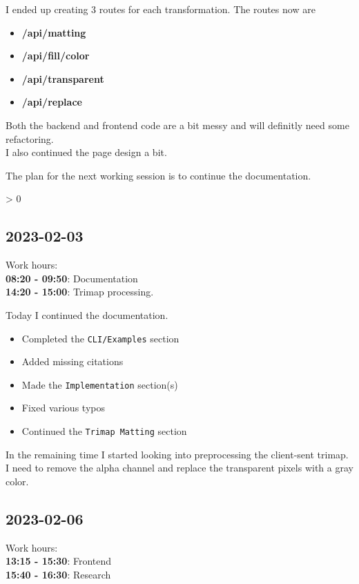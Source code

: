 \documentclass{article}
\makeatletter
\newcommand{\wrapfill}{
    \par
    \ifnum \value{WF@wrappedlines} > 0
        \addtocounter{WF@wrappedlines}{-1}%
        \null\vspace{
            \arabic{WF@wrappedlines}
            \baselineskip
        }
        \WFclear
    \fi
}
\makeatother
\begin{document}
I ended up creating 3 routes for each transformation. The routes now are
\begin{itemize}
    \item \textbf{/api/matting}
    \item \textbf{/api/fill/color}
    \item \textbf{/api/transparent}
    \item \textbf{/api/replace}
\end{itemize}

Both the backend and frontend code are a bit messy and will definitly
need some refactoring. \\
I also continued the page design a bit.

The plan for the next working session is to continue the documentation.

\wrapfill

\pagebreak

\subsection{2023-02-03}

Work hours:\\
\textbf{08:20 - 09:50}: Documentation \\
\textbf{14:20 - 15:00}: Trimap processing.

Today I continued the documentation.

\begin{itemize}
    \item Completed the \texttt{CLI/Examples} section
    \item Added missing citations
    \item Made the \texttt{Implementation} section(s)
    \item Fixed various typos
    \item Continued the \texttt{Trimap Matting} section
\end{itemize}

In the remaining time I started looking into
preprocessing the client-sent trimap.
I need to remove the alpha channel and replace the transparent pixels
with a gray color.

\subsection{2023-02-06}

Work hours:\\
\textbf{13:15 - 15:30}: Frontend \\
\textbf{15:40 - 16:30}: Research
\end{document}

